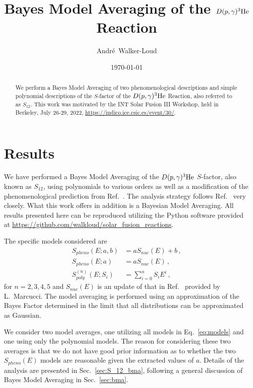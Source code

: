 \documentclass[prd,11pt,superscriptaddress,notitlepage,tightenlines,nofootinbib,floatfix]{revtex4-1}
\begin{document}
\title{Bayes Model Averaging of the $D(p,{\gamma})^3{\rm He}$ Reaction}


\author{Andr\'{e}~Walker-Loud}

\date{\today}

\begin{abstract}
We perform a Bayes Model Averaging of two phenomenological descriptions and simple polynomial descriptions of the $S$-factor of the $D(p,{\gamma})^3{\rm He}$ Reaction, also referred to as $S_{12}$.
This work was motivated by the INT Solar Fusion III Workshop, held in Berkeley, July 26-29, 2022, \url{https://indico.ice.csic.es/event/30/}.
\end{abstract}
\maketitle
\tableofcontents

\section{Results}
We have performed a Bayes Model Averaging of the $D(p,{\gamma})^3{\rm He}$ $S$-factor, also known as $S_{12}$, using polynomials to various orders as well as a modification of the phenomenological prediction from Ref.~\cite{Marcucci:2005zc}.
The analysis strategy follows Ref.~\cite{Moscoso:2021xog} very closely.
What this work offers in addition is a Bayesian Model Averaging.
All results presented here can be reproduced utilizing the Python software provided at \url{https://github.com/walkloud/solar_fusion_reactions}.



The specific models considered are 
\begin{align}\label{eq:models}
S_{pheno}(E; a, b) &= a S_{nuc}(E) + b\, ,
\nonumber\\
S_{pheno}(E; a) &= a S_{nuc}(E)\, ,
\nonumber\\
S_{poly}^{(n)}(E; S_i) &= \sum_{i=0}^n S_i E^i\, ,
\end{align}
for $n=2,3,4,5$ and $S_{nuc}(E)$ is an update of that in Ref.~\cite{Marcucci:2005zc} provided by L.~Marcucci.
The model averaging is performed using an approximation of the Bayes Factor determined in the limit that all distributions can be approximated as Gaussian.

We consider two model averages, one utilizing all models in Eq.~\eqref{eq:models} and one using only the polynomial models.  The reason for considering these two averages is that we do not have good prior information as to whether the two $S_{pheno}(E)$ models are reasonable given the extracted values of $a$.
Details of the analysis are presented in Sec.~\ref{sec:S_12_bma}, following a general discussion of Bayes Model Averaging in Sec.~\ref{sec:bma}.
\end{document}
